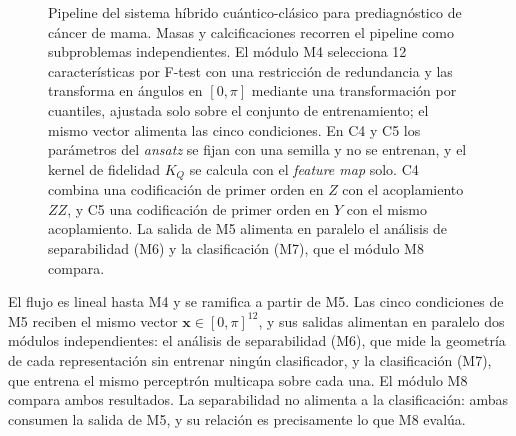 \begin{figure}[H]

\caption{%
  Pipeline del sistema híbrido cuántico-clásico para prediagnóstico de cáncer de mama.
  Masas y calcificaciones recorren el pipeline como subproblemas independientes.
  El módulo M4 selecciona 12 características por F-test con una restricción de
  redundancia y las transforma en ángulos en $[0,\pi]$ mediante una transformación por
  cuantiles, ajustada solo sobre el conjunto de entrenamiento; el mismo vector alimenta las
  cinco condiciones. En C4 y C5 los parámetros del \textit{ansatz} se fijan con una semilla
  y no se entrenan, y el kernel de fidelidad $K_Q$ se calcula con el \textit{feature map}
  solo. C4 combina una codificación de primer orden en $Z$ con el acoplamiento $ZZ$, y C5
  una codificación de primer orden en $Y$ con el mismo acoplamiento. La salida de M5 alimenta en paralelo el análisis de
  separabilidad (M6) y la clasificación (M7), que el módulo M8 compara.%
}
\label{fig:pipeline_sistema}
\end{figure}

El flujo es lineal hasta M4 y se ramifica a partir de M5. Las cinco condiciones de M5 reciben el
mismo vector $\mathbf{x}\in[0,\pi]^{12}$, y sus salidas alimentan en paralelo dos módulos
independientes: el análisis de separabilidad (M6), que mide la geometría de cada representación
sin entrenar ningún clasificador, y la clasificación (M7), que entrena el mismo perceptrón
multicapa sobre cada una. El módulo M8 compara ambos resultados. La separabilidad no alimenta a la
clasificación: ambas consumen la salida de M5, y su relación es precisamente lo que M8 evalúa.
